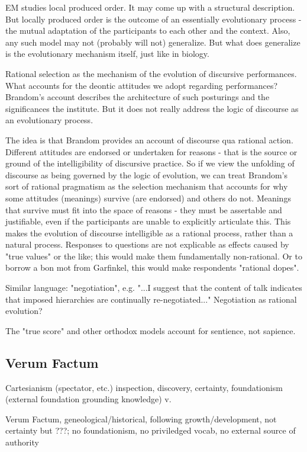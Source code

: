\documentclass[11pt,twoside]{article}
\begin{document}
EM studies local produced order.  It may come up with a structural
description.  But locally produced order is the outcome of an
essentially evolutionary process - the mutual adaptation of the
participants to each other and the context.  Also, any such model may
not (probably will not) generalize.  But what does generalize is the
evolutionary mechanism itself, just like in biology.

Rational selection as the mechanism of the evolution of discursive
performances.  What accounts for the deontic attitudes we adopt
regarding performances?  Brandom's account describes the architecture
of such posturings and the significances the institute.  But it does
not really address the logic of discourse as an evolutionary process.

The idea is that Brandom provides an account of discourse qua rational
action.  Different attitudes are endorsed or undertaken for reasons -
that is the source or ground of the intelligibility of discursive
practice.  So if we view the unfolding of discourse as being governed
by the logic of evolution, we can treat Brandom's sort of rational
pragmatism as the selection mechanism that accounts for why some
attitudes (meanings) survive (are endorsed) and others do not.
Meanings that survive must fit into the space of reasons - they must
be assertable and justifiable, even if the participants are unable to
explicitly articulate this.  This makes the evolution of discourse
intelligible as a rational process, rather than a natural process.
Responses to questions are not explicable as effects caused by "true
values" or the like; this would make them fundamentally non-rational.
Or to borrow a bon mot from Garfinkel, this would make respondents
"rational dopes".

Similar language: "negotiation", e.g. "...I suggest that the content
of talk indicates that imposed hierarchies are continually
re-negotiated..."  Negotiation as rational evolution?

The "true score" and other orthodox models account for sentience, not
sapience.

\subsection{Verum Factum}

Cartesianism (spectator, etc.) inspection, discovery, certainty,
foundationism (external foundation grounding knowledge) v.

Verum Factum, geneological/historical, following growth/development,
not certainty but ???; no foundationism, no priviledged vocab, no
external source of authority
\end{document}

